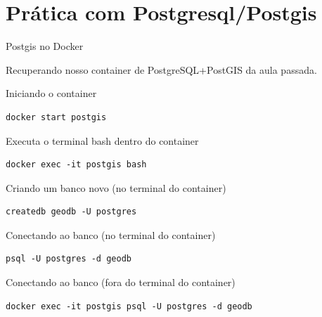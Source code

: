 \documentclass{beamer}
\begin{document}
\section{Prática com Postgresql/Postgis}
\begin{frame}[fragile]{Postgis no Docker}
    
    Recuperando nosso container de PostgreSQL+PostGIS da aula passada.
    
    \vspace{0.4cm}
    Iniciando o container
    \begin{verbatim}
docker start postgis
    \end{verbatim}

    Executa o terminal bash dentro do container
\begin{verbatim}
docker exec -it postgis bash 
    \end{verbatim}

    Criando um banco novo (no terminal do container)
    \begin{verbatim}
createdb geodb -U postgres
    \end{verbatim}
    
    Conectando ao banco (no terminal do container)
    \begin{verbatim}
psql -U postgres -d geodb
    \end{verbatim}     

Conectando ao banco (fora do terminal do container)
    \begin{verbatim}
docker exec -it postgis psql -U postgres -d geodb 
    \end{verbatim}     
\end{frame}
\end{document}
